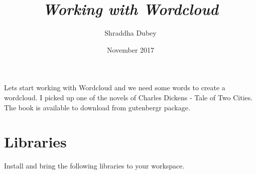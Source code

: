 \documentclass[12pt, letterpaper, twoside]{article}\usepackage[]{graphicx}\usepackage[]{color}
\title {\textbf{\emph{Working with Wordcloud}}}
\author{Shraddha Dubey}
\date{November 2017}
\begin{document}
\maketitle

\begin{center}
\noindent Lets start working with Wordcloud and we need some words to create a wordcloud. I picked up one of the novels of Charles Dickens - Tale of Two Cities. The book is available to download from gutenbergr package.

\end{center}

\section{Libraries}
\noindent Install and bring the following libraries to your workspace.
\end{document}

